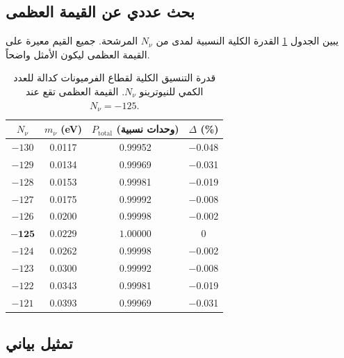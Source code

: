 \documentclass[12pt,a4paper]{article}
\begin{document}
	\subsection{بحث عددي عن القيمة العظمى}
	
	يبين الجدول \ref{tab:power} القدرة الكلية النسبية لمدى من \(N_{\nu}\) المرشحة. جميع القيم معيرة على القيمة العظمى ليكون الأمثل واضحاً.
	
	\begin{table}[H]
		\centering
		\caption{قدرة التنسيق الكلية لقطاع الفرميونات كدالة للعدد الكمي للنيوترينو \(N_{\nu}\). القيمة العظمى تقع عند \(N_{\nu}=-125\).}
		\label{tab:power}
		\small
		\begin{tabular}{c c c c}
			\toprule
			\(N_{\nu}\) & \(m_{\nu}\) (eV) & \(P_{\mathrm{total}}\) (وحدات نسبية) & \(\Delta\) (\%) \\
			\midrule
			\(-130\) & 0.0117 & 0.99952 & $-$0.048 \\
			\(-129\) & 0.0134 & 0.99969 & $-$0.031 \\
			\(-128\) & 0.0153 & 0.99981 & $-$0.019 \\
			\(-127\) & 0.0175 & 0.99992 & $-$0.008 \\
			\(-126\) & 0.0200 & 0.99998 & $-$0.002 \\
			$\mathbf{-125}$ & $\mathbf{0.0229}$ & $\mathbf{1.00000}$ & 0 \\
			\(-124\) & 0.0262 & 0.99998 & $-$0.002 \\
			\(-123\) & 0.0300 & 0.99992 & $-$0.008 \\
			\(-122\) & 0.0343 & 0.99981 & $-$0.019 \\
			\(-121\) & 0.0393 & 0.99969 & $-$0.031 \\
			\bottomrule
		\end{tabular}
	\end{table}
	
	\subsection{تمثيل بياني}
	
\end{document}
